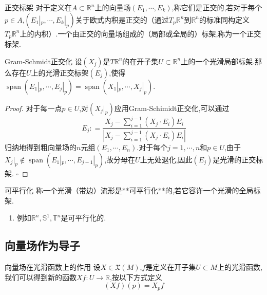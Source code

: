 \documentclass[../../几何与拓扑.tex]{subfiles}
\begin{document}
\begin{definition}{正交标架}
    对于定义在$A\subset \mathbb{R}^{n}$上的向量场$\left(E_{1},{\cdots},E_{k} \right)$,称它们是正交的,若对于每个$p \in A$,$\left( E_{1}|_{p},{\cdots},E_{k}|_{p} \right)$关于欧式内积是正交的（通过$T_{p}\mathbb{R}^{n}$到$\mathbb{R}^{n}$的标准同构定义$T_{p}\mathbb{R}^{n}$上的内积）.一个由正交的向量场组成的（局部或全局的）标架,称为一个正交标架.
\end{definition}

\begin{lemma}{Gram-Schmidt正交化}
    设$\left( X_{j} \right)$是$T\mathbb{R}^{n}$的在开子集$U\subset \mathbb{R}^{n}$上的一个光滑局部标架.那么存在$U$上的光滑正交标架$\left( E_{j} \right)$,使得$\operatorname{span}\left(  E_{1}|_{p},{\cdots},E_{j}|_{p} \right)=\operatorname{span}\left( X_{1}|_{p},{\cdots},X_{j}|_{p} \right)$.
\end{lemma}
\begin{proof}
    对于每一点$p \in U$,对$\left( X_{j}|_{p} \right)$应用Gram-Schimidt正交化,可以通过 $$ E_{j}: = \frac{{X_{j}-\sum _{i=1}^{j-1}\left( X_{j}\cdot E_{i} \right) E_{i}}}{\left| X_{j}-\sum _{i=1}^{j-1}\left( X_{j}\cdot E_{i} \right) E_{i} \right| } $$归纳地得到粗向量场的$n$元组$\left( E_{1},{\cdots},E_{n} \right)$.对于每个$j=1,{\cdots},n$和$p \in U$,由于$X_{j}|_{p}\not\in \operatorname{span}\left( E_{1}|_{p},{\cdots},E_{j-1}|_{p} \right)$,故分母在$U$上无处退化,因此$\left( E_{j} \right)$是光滑的正交标架.
    \hfill $\square$
\end{proof}

\begin{definition}{可平行化}
    称一个光滑（带边）流形是**可平行化**的,若它容许一个光滑的全局标架.
\end{definition}
\begin{remark}
    \begin{enumerate}
        \item 例如$\mathbb{R}^{n},\mathbb{S}^{1},\mathbb{T}^{n}$是可平行化的.
    \end{enumerate}
    
\end{remark}

\subsection{向量场作为导子}

\begin{definition}{向量场在光滑函数上的作用}
    设$X \in \mathfrak{X}\left( M \right)$,$f$是定义在开子集$U\subset M$上的光滑函数,我们可以得到新的函数$Xf:U\to \mathbb{R}$,按以下方式定义 $$ \left( Xf \right) \left( p \right) =X_{p}f $$
\end{definition}
\end{document}
